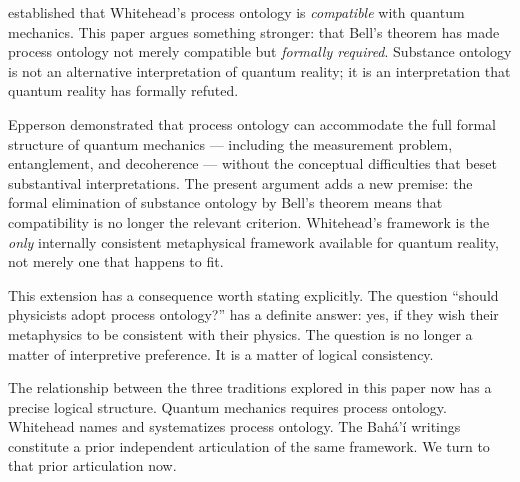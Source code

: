 \citet{Epperson2004} established that Whitehead's process ontology is
\emph{compatible} with quantum mechanics.
This paper argues something stronger: that Bell's theorem has made process
ontology not merely compatible but \emph{formally required}.
Substance ontology is not an alternative interpretation of quantum reality;
it is an interpretation that quantum reality has formally refuted.

Epperson demonstrated that process ontology can accommodate the full
formal structure of quantum mechanics --- including the measurement problem,
entanglement, and decoherence --- without the conceptual difficulties that
beset substantival interpretations.
The present argument adds a new premise: the formal elimination of
substance ontology by Bell's theorem means that compatibility is no
longer the relevant criterion.
Whitehead's framework is the \emph{only} internally consistent metaphysical
framework available for quantum reality, not merely one that happens to fit.

This extension has a consequence worth stating explicitly.
The question ``should physicists adopt process ontology?'' has a definite
answer: yes, if they wish their metaphysics to be consistent with their
physics.
The question is no longer a matter of interpretive preference.
It is a matter of logical consistency.

The relationship between the three traditions explored in this paper now
has a precise logical structure.
Quantum mechanics requires process ontology.
Whitehead names and systematizes process ontology.
The Bahá'í writings constitute a prior independent articulation of
the same framework.
We turn to that prior articulation now.
